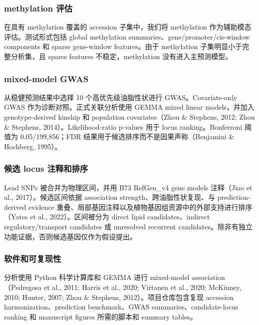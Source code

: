 \documentclass[
]{article}
\begin{document}
\subsubsection{methylation 评估}\label{methylation-ux8bc4ux4f30}

在具有 methylation 覆盖的 accession 子集中，我们将 methylation
作为辅助模态评估。测试形式包括 global methylation
summaries、gene/promoter/cis-window components 和 sparse gene-window
features。由于 methylation 子集明显小于完整分析集，且 sparse features
不稳定，methylation 没有进入主预测模型。

\subsubsection{mixed-model GWAS}\label{mixed-model-gwas}

从稳健预测结果中选择 10 个高优先级油脂性状进行 GWAS。Covariate-only GWAS
作为诊断对照。正式关联分析使用 GEMMA mixed linear models，并加入
genotype-derived kinship 和 population covariates（Zhou \& Stephens,
2012; Zhou \& Stephens, 2014）。Likelihood-ratio p-values 用于 locus
ranking。Bonferroni 阈值为 0.05/199,856；FDR
结果用于候选排序而不是因果声称（Benjamini \& Hochberg, 1995）。

\subsubsection{候选 locus
注释和排序}\label{ux5019ux9009-locus-ux6ce8ux91caux548cux6392ux5e8f}

Lead SNPs 被合并为物理区间，并用 B73 RefGen\_v4 gene models 注释（Jiao
et al., 2017）。候选区间依据 association strength、跨油脂性状复现、与
prediction-derived evidence
重叠、局部基因注释以及植物基因组资源中的外部支持进行排序（Yates et al.,
2022）。区间被分为 direct lipid candidates、indirect
regulatory/transport candidates 或 unresolved recurrent
candidates。除非有独立功能证据，否则候选基因仅作为假设提出。

\subsubsection{软件和可复现性}\label{ux8f6fux4ef6ux548cux53efux590dux73b0ux6027}

分析使用 Python 科学计算库和 GEMMA 进行 mixed-model
association（Pedregosa et al., 2011; Harris et al., 2020; Virtanen et
al., 2020; McKinney, 2010; Hunter, 2007; Zhou \& Stephens,
2012）。项目仓库包含复现 accession harmonization、prediction
benchmark、GWAS summaries、candidate-locus ranking 和 manuscript figures
所需的脚本和 summary tables。
\end{document}
